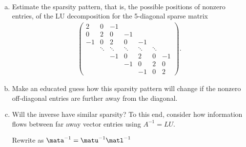 
\begin{Sheet}
  \label{sheet8}

  \begin{Problem}
    \hfill\\\vspace{-6ex}
    \begin{enumerate}[(a)]
    \item Estimate the sparsity pattern, that is, the possible
      positions of nonzero entries, of the LU decomposition for the
      5-diagonal sparse matrix
      \begin{gather*}
        \begin{pmatrix}
           2 & 0 &-1 &   &   & & \\
           0 & 2 & 0 &-1 &   & & \\
          -1 & 0 & 2 & 0 &-1 & & \\
             & \ddots & \ddots & \ddots & \ddots & \ddots  & \\
             & &-1 & 0 & 2 & 0 &-1 \\
             & &   &-1 & 0 & 2 & 0 \\
             & &   &   &-1 & 0 & 2
        \end{pmatrix}.
      \end{gather*}
    \item Make an educated guess how this sparsity pattern will change
      if the nonzero off-diagonal entries are further away from the
      diagonal.
    \item Will the inverse have similar sparsity? To this end,
      consider how information flows between far away vector entries
      using $A^{-1} = LU$.
      \begin{todo}
        Rewrite as $\mata^{-1} = \matu^{-1}\matl^{-1}$
      \end{todo}
    \end{enumerate}
  \end{Problem}


\end{Sheet}
